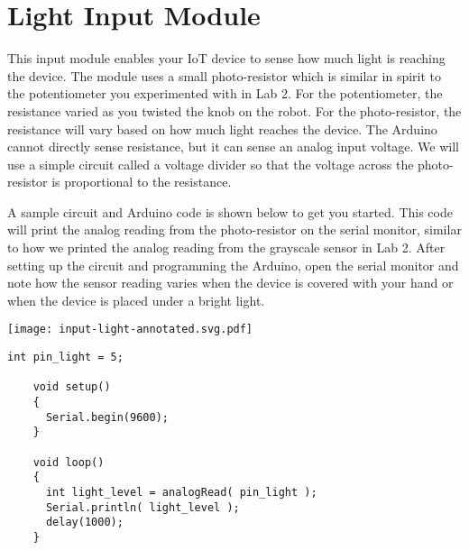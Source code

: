 
\section{Light Input Module}
\label{sec-input-light}

This input module enables your IoT device to sense how much light is
reaching the device. The module uses a small photo-resistor which is
similar in spirit to the potentiometer you experimented with in Lab 2.
For the potentiometer, the resistance varied as you twisted the knob on
the robot. For the photo-resistor, the resistance will vary based on how
much light reaches the device. The Arduino cannot directly sense
resistance, but it can sense an analog input voltage. We will use a
simple circuit called a voltage divider so that the voltage across the
photo-resistor is proportional to the resistance.

A sample circuit and Arduino code is shown below to get you started. This
code will print the analog reading from the photo-resistor on the serial
monitor, similar to how we printed the analog reading from the grayscale
sensor in Lab 2. After setting up the circuit and programming the
Arduino, open the serial monitor and note how the sensor reading varies
when the device is covered with your hand or when the device is placed
under a bright light.

\vspace{0.1in}
\begin{minipage}{0.49\tw}
  \texttt{[image: input-light-annotated.svg.pdf]}
\end{minipage}
\hfill
\begin{minipage}{0.49\tw}
  \begin{Verbatim}[gobble=3,fontsize=\small]
    int pin_light = 5;

    void setup()
    {
      Serial.begin(9600);
    }

    void loop()
    {
      int light_level = analogRead( pin_light );
      Serial.println( light_level );
      delay(1000);
    }
  \end{Verbatim}
\end{minipage}

